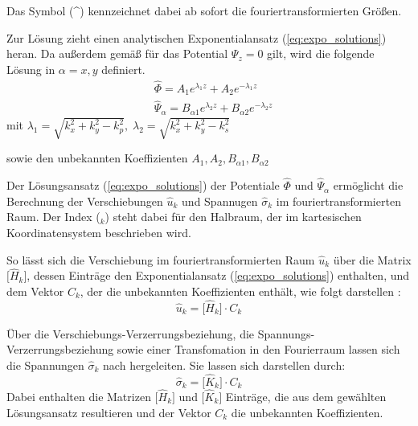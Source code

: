 Das Symbol (\^{}) kennzeichnet dabei ab sofort die fouriertransformierten Größen.


Zur Lösung zieht \cite{Fruehe2010} einen analytischen Exponentialansatz (\ref{eq:expo_solutions}) heran. Da außerdem gemäß \cite{Long1967} für das Potential $\Psi_{z} = 0$ gilt, wird die folgende Lösung in $\alpha=x,y$ definiert.
\begin{subequations}\label{eq:expo_solutions}
	{\begin{align}
			&\hat{\Phi} = A_{1} e^{\lambda_{1} z} + A_{2} e^{-\lambda_{1} z}\label{eq:phi_sol}\\[4pt]
			&\hat{\Psi}_{\alpha} = B_{\alpha1} e^{\lambda_{2} z} + B_{\alpha2} e^{-\lambda_{2} z}\label{eq:psi_sol}
		\end{align}
	}
\end{subequations}
mit \( \lambda_{1} = \sqrt{k_x^{2}+k_y^{2}-k_p^{2}},\;
\lambda_{2} = \sqrt{k_x^{2}+k_y^{2}-k_s^{2}} \)

sowie den unbekannten Koeffizienten
\(A_1, A_2, B_{\alpha1}, B_{\alpha2}\)

Der Lösungsansatz (\ref{eq:expo_solutions}) der Potentiale $\hat{\Phi}$ und $\hat{\Psi}_{\alpha}$ ermöglicht die Berechnung der Verschiebungen \(\hat{u}_{k}\) und Spannugen \(\hat{\sigma}_{k}\) im fouriertransformierten Raum. 
Der Index (\({}_k\)) steht dabei für den Halbraum, der im kartesischen Koordinatensystem beschrieben wird.

So lässt sich die Verschiebung im fouriertransformierten Raum \(\hat{u}_{k}\) über die Matrix $\bigl[\hat{H}_{k}\bigr]$, dessen Einträge den Exponentialansatz (\ref{eq:expo_solutions}) enthalten, und dem Vektor $C_k$, der die unbekannten Koeffizienten enthält, wie folgt darstellen \citep{Fruehe2010}: 
\begin{equation}\label{eq:displ_hs}
	\hat{u}_{k} = \bigl[\hat{H}_{k}\bigr]\cdot C_{k}
\end{equation}


Über die Verschiebungs-Verzerrungsbeziehung, die Spannungs-Verzerrungsbeziehung sowie einer Transfomation in den Fourierraum lassen sich die Spannungen \(\hat{\sigma}_{k}\) nach \cite{Mueller2007} hergeleiten. Sie lassen sich darstellen durch:
\begin{equation}\label{eq:sigma_factorization}
	\hat{\sigma}_{k} = \bigl[\hat{K}_{k}\bigr]\cdot C_{k}
\end{equation}
Dabei enthalten die Matrizen $\bigl[\hat{H}_{k}\bigr]$ und $\bigl[\hat{K}_{k}\bigr]$ Einträge, die aus dem gewählten Lösungsansatz resultieren und der Vektor $C_k$ die unbekannten Koeffizienten.

